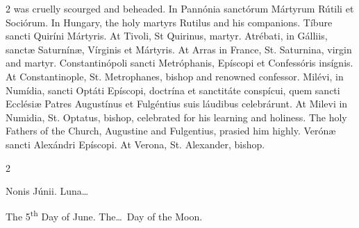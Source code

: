 \begin{paracol}{2}
 was cruelly scourged and beheaded.
\switchcolumn*
{}
In Pannónia sanctórum 
 Mártyrum Rútili et Sociórum.
\switchcolumn
{}
In Hungary, the holy martyrs Rutilus 
 and his companions.
\switchcolumn*
{}
Tíbure sancti Quiríni 
 Mártyris.
\switchcolumn
{}
At Tivoli, St Quirinus, martyr.
\switchcolumn*
{}
Atrébati, in Gálliis, 
 sanctæ Saturnínæ, Vírginis et Mártyris.
\switchcolumn
{}
At Arras in France, St. Saturnina, 
 virgin and martyr.
\switchcolumn*
{}
Constantinópoli sancti 
 Metróphanis, Epíscopi et Confessóris insígnis.
\switchcolumn
{}
At Constantinople, St. Metrophanes, 
 bishop and renowned confessor.
\switchcolumn*
{}
Milévi, in Numídia, 
 sancti Optáti Epíscopi, doctrína et sanctitáte conspícui, quem sancti 
 Ecclésiæ Patres Augustínus et Fulgéntius suis láudibus celebrárunt.
\switchcolumn
{}
At Milevi in Numidia, St. Optatus, 
 bishop, celebrated for his learning and holiness. The holy Fathers of 
 the Church, Augustine and Fulgentius, prasied him highly.
\switchcolumn*
{}
Verónæ sancti 
 Alexándri Epíscopi.
\switchcolumn
{}
At Verona, St. Alexander, bishop.
\switchcolumn*
{}
\end{paracol}


\begin{paracol}{2}
\begin{center}{\color{gregoriocolor} Nonis Júnii. 
 Luna\dots\ }\end{center}
\switchcolumn
{}
\begin{center}{\color{gregoriocolor} The 5\textsuperscript{th} Day of 
 June. The\dots\ Day of the Moon.}\end{center}
\end{paracol}

